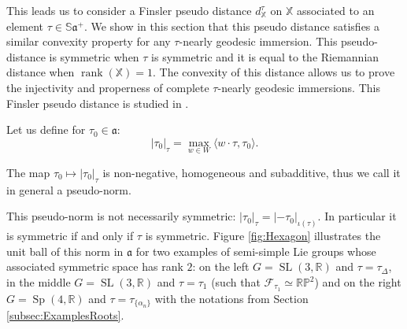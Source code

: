 \documentclass[reqno,10pt]{amsart}
\theoremstyle{plain}
\theoremstyle{definition}
\theoremstyle{remark}
\newcommand{\type}{\tau}
\newcommand{\typeS}{{\tau_0}}
\newcommand{\R}{\mathbb{R}}
\newcommand{\Sph}{\mathbb{S}}
\DeclareMathOperator{\SL}{SL}
\DeclareMathOperator{\Sp}{Sp}
\DeclareMathOperator{\rank}{rank}
\newcommand{\X}{\mathbb{X}}
\begin{document}
 This leads us to consider a Finsler pseudo distance $d^\type_\X$ on $\X$ associated to an element $\type\in \Sph\mathfrak{a}^+$. We show in this section that this pseudo distance satisfies a similar convexity property for any $\type$-nearly geodesic immersion. This pseudo-distance is symmetric when $\type$ is symmetric and it is equal to the Riemannian distance when $\rank(\X)=1$. The convexity of this distance allows us to prove the injectivity and properness of complete $\type$-nearly geodesic immersions. This Finsler pseudo distance is studied in \cite[{Section 5}]{KLBFinsler}.

\medskip

Let us define for $\typeS\in \mathfrak{a}$:
$$|\typeS|_\type=\max_{w\in W}\langle w\cdot \type,\typeS\rangle.$$ 


The map $\typeS\mapsto |\typeS|_\type$ is non-negative, homogeneous and subadditive, thus we call it in general a pseudo-norm.

\medskip

This pseudo-norm is not necessarily symmetric: $|\typeS|_\type=|-\typeS|_{\iota(\type)}$. In particular it is symmetric if and only if $\type$ is symmetric. Figure \ref{fig:Hexagon} illustrates the unit ball of this norm in $\mathfrak{a}$ for two examples of semi-simple Lie groups whose associated symmetric space has rank $2$: on the left $G=\SL(3,\R)$ and $\type=\type_\Delta$, in the middle $G=\SL(3,\R)$ and $\type=\type_1$ (such that $\mathcal{F}_{\tau_1}\simeq \mathbb{RP}^2$) and on the right $G=\Sp(4,\R)$ and $\type=\type_{\lbrace\alpha_n\rbrace}$ with the notations from Section \ref{subsec:ExamplesRoots}.
\end{document}
